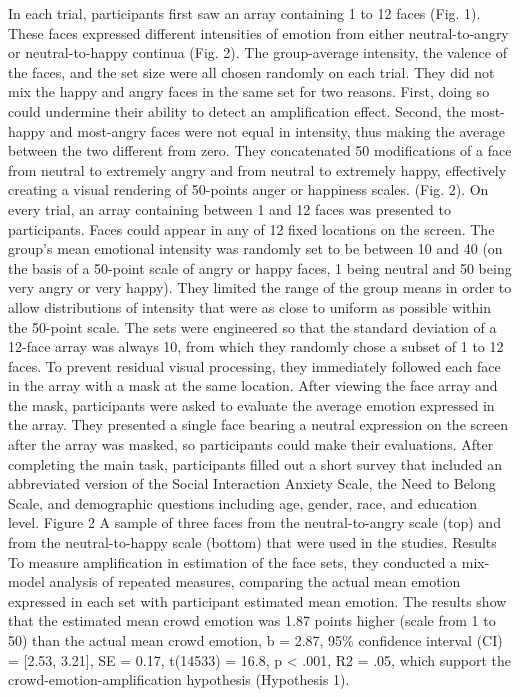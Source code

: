 \documentclass[
  man]{apa6}
\begin{document}
In each trial, participants first saw an array containing 1 to 12 faces (Fig. 1). These faces expressed different intensities of emotion from either neutral-to-angry or neutral-to-happy continua (Fig. 2). The group-average intensity, the valence of the faces, and the set size were all chosen randomly on each trial. They did not mix the happy and angry faces in the same set for two reasons. First, doing so could undermine their ability to detect an amplification effect. Second, the most-happy and most-angry faces were not equal in intensity, thus making the average between the two different from zero.
They concatenated 50 modifications of a face from neutral to extremely angry and from neutral to extremely happy, effectively creating a visual rendering of 50-points anger or happiness scales. (Fig. 2). On every trial, an array containing between 1 and 12 faces was presented to participants. Faces could appear in any of 12 fixed locations on the screen.
The group's mean emotional intensity was randomly set to be between 10 and 40 (on the basis of a 50-point scale of angry or happy faces, 1 being neutral and 50 being very angry or very happy). They limited the range of the group means in order to allow distributions of intensity that were as close to uniform as possible within the 50-point scale. The sets were engineered so that the standard deviation of a 12-face array was always 10, from which they randomly chose a subset of 1 to 12 faces.
To prevent residual visual processing, they immediately followed each face in the array with a mask at the same location. After viewing the face array and the mask, participants were asked to evaluate the average emotion expressed in the array. They presented a single face bearing a neutral expression on the screen after the array was masked, so participants could make their evaluations.
After completing the main task, participants filled out a short survey that included an abbreviated version of the Social Interaction Anxiety Scale, the Need to Belong Scale, and demographic questions including age, gender, race, and education level.
Figure 2 A sample of three faces from the neutral-to-angry scale (top) and from the neutral-to-happy scale (bottom) that were used in the studies.
Results
To measure amplification in estimation of the face sets, they conducted a mix-model analysis of repeated measures, comparing the actual mean emotion expressed in each set with participant estimated mean emotion. The results show that the estimated mean crowd emotion was 1.87 points higher (scale from 1 to 50) than the actual mean crowd emotion, b = 2.87, 95\% confidence interval (CI) = {[}2.53, 3.21{]}, SE = 0.17, t(14533) = 16.8, p \textless{} .001, R2 = .05, which support the crowd-emotion-amplification hypothesis (Hypothesis 1).
\end{document}
